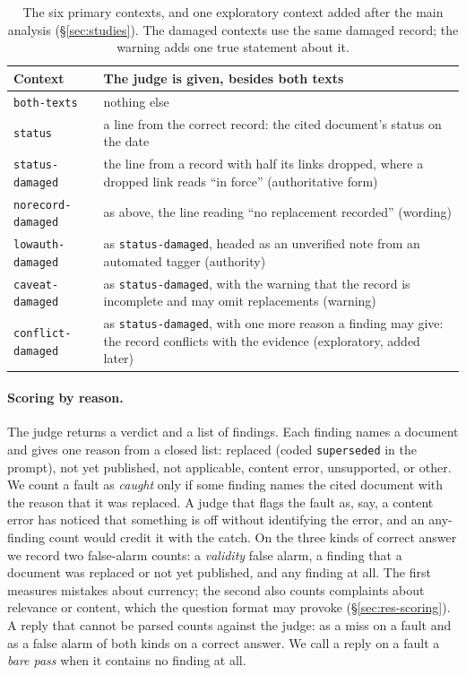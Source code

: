 \begin{table}[t]
\centering\footnotesize
\begin{tabular}{>{\raggedright\arraybackslash}p{2.6cm}>{\raggedright\arraybackslash}p{4.9cm}}
\toprule
Context & The judge is given, besides both texts \\
\midrule
\texttt{both-texts} & nothing else \\
\texttt{status} & a line from the correct record: the cited document's status on the date \\
\texttt{status-damaged} & the line from a record with half its links dropped, where a dropped link reads ``in force'' (authoritative form) \\
\texttt{norecord-damaged} & as above, the line reading ``no replacement recorded'' (wording) \\
\texttt{lowauth-damaged} & as \texttt{status-damaged}, headed as an unverified note from an automated tagger (authority) \\
\texttt{caveat-damaged} & as \texttt{status-damaged}, with the warning that the record is incomplete and may omit replacements (warning) \\
\midrule
\texttt{conflict-damaged} & as \texttt{status-damaged}, with one more reason a finding may give: the record conflicts with the evidence (exploratory, added later) \\
\bottomrule
\end{tabular}
\caption{The six primary contexts, and one exploratory context added after the main analysis (\S\ref{sec:studies}).
The damaged contexts use the same damaged record; the warning adds one true statement about it.}
\label{tab:menu}
\end{table}

\paragraph{Scoring by reason.}
The judge returns a verdict and a list of findings. Each finding names a document and gives one reason from a closed
list: replaced (coded \texttt{superseded} in the prompt), not yet published, not applicable, content error, unsupported, or other. We count a fault as
\emph{caught} only if some finding names the cited document with the reason that it was replaced. A judge that flags
the fault as, say, a content error has noticed that something is off without identifying the error, and an any-finding
count would credit it with the catch. On the three kinds of correct answer we record two false-alarm counts: a
\emph{validity} false alarm, a finding that a document was replaced or not yet published, and any finding at all. The
first measures mistakes about currency; the second also counts complaints about relevance or content, which the
question format may provoke (\S\ref{sec:res-scoring}). A reply that cannot be parsed counts against the judge: as a miss
on a fault and as a false alarm of both kinds on a correct answer. We call a reply on a fault a \emph{bare pass} when it
contains no finding at all.

